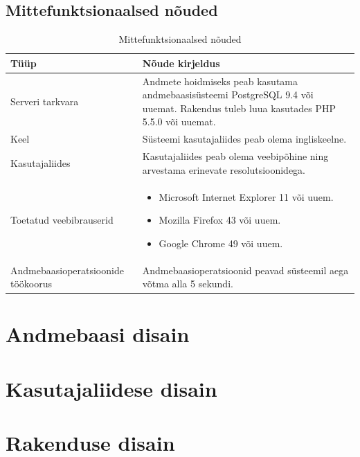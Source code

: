 \documentclass[a4paper,12pt]{article} %
\begin{document}
\subsection{Mittefunktsionaalsed nõuded}
\begin{table}[H]%
\begin{center}
\begin{tabular}{|p{4cm}|p{11cm}|}
\hline
\rowcolor{rowgray}
Tüüp & Nõude kirjeldus \\ \hline

Serveri tarkvara & Andmete hoidmiseks peab kasutama andmebaasisüsteemi PostgreSQL 9.4 või uuemat. Rakendus tuleb luua kasutades PHP 5.5.0 või uuemat. \\ \hline

Keel & Süsteemi kasutajaliides peab olema ingliskeelne. \\ \hline

Kasutajaliides & Kasutajaliides peab olema veebipõhine ning arvestama erinevate resolutsioonidega. \\ \hline
 
Toetatud veebibrauserid & 
\begin{itemize}
\item Microsoft Internet Explorer 11 või uuem.
\item Mozilla Firefox 43 või uuem.
\item Google Chrome 49 või uuem.
\end{itemize}
 \\ \hline

Andmebaasioperatsioonide töökoorus & Andmebaasioperatsioonid peavad süsteemil aega võtma alla 5 sekundi. \\ \hline

\end{tabular}
\caption{Mittefunktsionaalsed nõuded}
\label{mittefunktsionaalsed_nõuded}
\end{center}
\end{table}


\section{Andmebaasi disain}
\section{Kasutajaliidese disain}
\section{Rakenduse disain}
\end{document}
